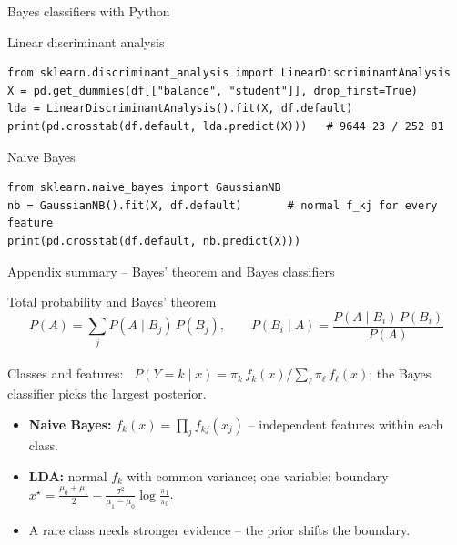 \documentclass[aspectratio=169,11pt]{beamer}
\begin{document}
\begin{frame}[fragile]{Bayes classifiers with Python}
  \begin{block}{Linear discriminant analysis}
\begin{lstlisting}
from sklearn.discriminant_analysis import LinearDiscriminantAnalysis
X = pd.get_dummies(df[["balance", "student"]], drop_first=True)
lda = LinearDiscriminantAnalysis().fit(X, df.default)
print(pd.crosstab(df.default, lda.predict(X)))   # 9644 23 / 252 81
\end{lstlisting}
  \end{block}
  \begin{block}{Naive Bayes}
\begin{lstlisting}
from sklearn.naive_bayes import GaussianNB
nb = GaussianNB().fit(X, df.default)       # normal f_kj for every feature
print(pd.crosstab(df.default, nb.predict(X)))
\end{lstlisting}
  \end{block}
\end{frame}

\begin{frame}{Appendix summary -- Bayes' theorem and Bayes classifiers}
  \begin{block}{Total probability and Bayes' theorem}
    \[
      P(A)=\sum_jP(A\mid B_j)\,P(B_j),
      \qquad
      P(B_i\mid A)=\frac{P(A\mid B_i)\,P(B_i)}{P(A)}
    \]
    \\[2pt]
    Classes and features: \
    $P(Y=k\mid x)=\pi_k\,f_k(x)\big/\sum_\ell\pi_\ell\,f_\ell(x)$; the Bayes
    classifier picks the largest posterior.
  \end{block}
  \begin{itemize}\setlength{\itemsep}{3pt}
    \item \textbf{Naive Bayes:} $f_k(x)=\prod_jf_{kj}(x_j)$ -- independent
          features within each class.
    \item \textbf{LDA:} normal $f_k$ with common variance; one variable:
          boundary
          $x^\star=\frac{\mu_0+\mu_1}{2}-\frac{\sigma^2}{\mu_1-\mu_0}\log\frac{\pi_1}{\pi_0}$.
    \item A rare class needs stronger evidence -- the prior shifts the
          boundary.
  \end{itemize}
\end{frame}
\end{document}

